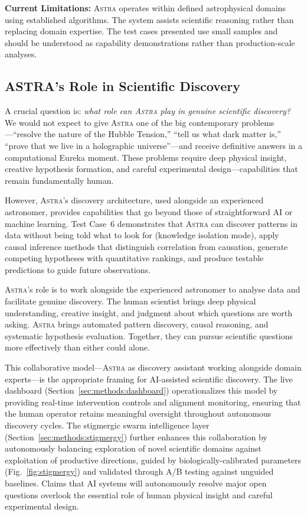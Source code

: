 \documentclass[usenatbib]{rasti}
\newcommand{\astra}{\textsc{Astra}\xspace}
\begin{document}
\textbf{Current Limitations:}
\astra operates within defined astrophysical domains using established algorithms.
The system assists scientific reasoning rather than replacing domain expertise.
The test cases presented use small samples and should be understood as capability demonstrations rather than production-scale analyses.

\subsection{ASTRA's Role in Scientific Discovery}
\label{sec:discussion:role}

A crucial question is: \emph{what role can \astra play in genuine scientific discovery?}
We would not expect to give \astra one of the big contemporary problems---``resolve the nature of the Hubble Tension,'' ``tell us what dark matter is,'' ``prove that we live in a holographic universe''---and receive definitive answers in a computational Eureka moment.
These problems require deep physical insight, creative hypothesis formation, and careful experimental design---capabilities that remain fundamentally human.

However, \astra's discovery architecture, used alongside an experienced astronomer, provides capabilities that go beyond those of straightforward AI or machine learning.
Test Case~6 demonstrates that \astra can discover patterns in data without being told what to look for (knowledge isolation mode), apply causal inference methods that distinguish correlation from causation, generate competing hypotheses with quantitative rankings, and produce testable predictions to guide future observations.

\astra's role is to work alongside the experienced astronomer to analyse data and facilitate genuine discovery.
The human scientist brings deep physical understanding, creative insight, and judgment about which questions are worth asking.
\astra brings automated pattern discovery, causal reasoning, and systematic hypothesis evaluation.
Together, they can pursue scientific questions more effectively than either could alone.

This collaborative model---\astra as discovery assistant working alongside domain experts---is the appropriate framing for AI-assisted scientific discovery.
The live dashboard (Section~\ref{sec:methods:dashboard}) operationalizes this model by providing real-time intervention controls and alignment monitoring, ensuring that the human operator retains meaningful oversight throughout autonomous discovery cycles.
The stigmergic swarm intelligence layer (Section~\ref{sec:methods:stigmergy}) further enhances this collaboration by autonomously balancing exploration of novel scientific domains against exploitation of productive directions, guided by biologically-calibrated parameters (Fig.~\ref{fig:stigmergy}) and validated through A/B testing against unguided baselines.
Claims that AI systems will autonomously resolve major open questions overlook the essential role of human physical insight and careful experimental design.
\end{document}
